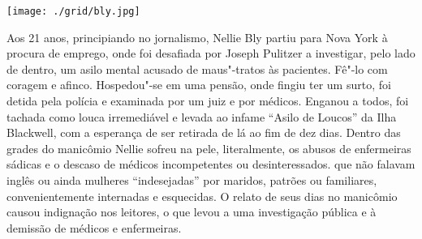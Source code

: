 \pagestyle{ima}
\label{ima}



\begin{center}
\hspace*{.5cm}\texttt{[image: ./grid/bly.jpg]}
\end{center}

\hspace*{-7cm}\hrulefill\hspace*{-7cm}

\medskip

\noindent{}Aos 21 anos, principiando no jornalismo, Nellie Bly partiu para Nova York à procura de emprego, onde foi desafiada por Joseph Pulitzer a investigar, pelo lado de dentro, um asilo mental acusado de maus"-tratos às pacientes. Fê"-lo com coragem e afinco. Hospedou"-se em uma pensão, onde fingiu ter um surto, foi detida pela polícia e examinada por um juiz e por médicos. Enganou a todos, foi tachada como louca irremediável e levada ao infame “Asilo de Loucos” da Ilha Blackwell, com a esperança de ser retirada de lá ao fim de dez dias. Dentro das grades do manicômio Nellie sofreu na pele, literalmente, os abusos de enfermeiras sádicas e o descaso de médicos incompetentes ou desinteressados.  que não falavam inglês ou ainda mulheres “indesejadas” por maridos, patrões ou familiares, convenientemente internadas e esquecidas.
O relato de seus dias no manicômio causou indignação nos leitores, o que levou a uma investigação pública e à demissão de médicos e enfermeiras.


